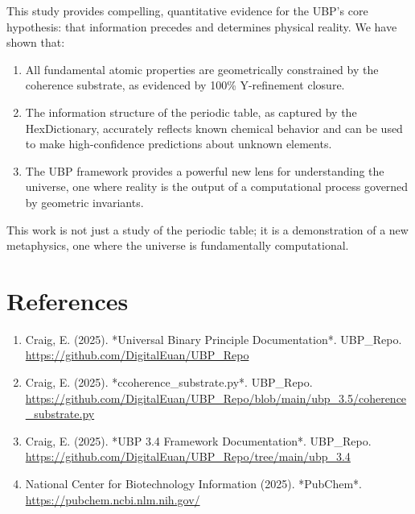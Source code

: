 \documentclass[12pt, a4paper]{article}
\begin{document}
This study provides compelling, quantitative evidence for the UBP's core hypothesis: that information precedes and determines physical reality. We have shown that:
\begin{enumerate}
    \item All fundamental atomic properties are geometrically constrained by the coherence substrate, as evidenced by 100\% Y-refinement closure.
    \item The information structure of the periodic table, as captured by the HexDictionary, accurately reflects known chemical behavior and can be used to make high-confidence predictions about unknown elements.
    \item The UBP framework provides a powerful new lens for understanding the universe, one where reality is the output of a computational process governed by geometric invariants.
\end{enumerate}

This work is not just a study of the periodic table; it is a demonstration of a new metaphysics, one where the universe is fundamentally computational.

\newpage


\section*{References}

\begin{enumerate}
    \item Craig, E. (2025). *Universal Binary Principle Documentation*. UBP\_Repo. \url{https://github.com/DigitalEuan/UBP\_Repo}
    \item Craig, E. (2025). *ccoherence\_substrate.py*. UBP\_Repo. \url{https://github.com/DigitalEuan/UBP\_Repo/blob/main/ubp_3.5/coherence\_substrate.py}
    \item Craig, E. (2025). *UBP 3.4 Framework Documentation*. UBP\_Repo. \url{https://github.com/DigitalEuan/UBP\_Repo/tree/main/ubp_3.4}
    \item National Center for Biotechnology Information (2025). *PubChem*. \url{https://pubchem.ncbi.nlm.nih.gov/}
\end{enumerate}
\end{document}
